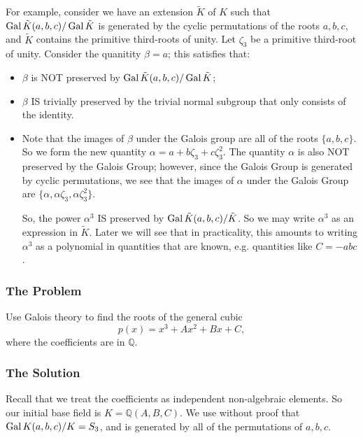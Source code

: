 \begin{itemize}
For example, consider we have an extension \(\tilde K\) of \(K\) such that 
\(\operatorname{Gal} \tilde K(a, b, c) / \operatorname{Gal} \tilde K\) is generated by the cyclic permutations of the roots
\(a, b, c\), and \(\tilde K\) contains the primitive third-roots of unity. Let \(\zeta_3\) be a
primitive third-root of unity. Consider the quanitity \(\beta = a\); this satisfies that: 
    \begin{itemize}
    \item \(\beta\) is NOT preserved by \(\operatorname{Gal} \tilde K(a, b, c) / \operatorname{Gal} \tilde K\); 
    \item \(\beta\) IS trivially preserved by the trivial normal subgroup that only consists
    of the identity.
    \item Note that the images of \(\beta\) under the Galois group are all of the roots \(\{a, b, c\}\).
    So we form the new quantity \(\alpha = a + b\zeta_3 + c\zeta_3^2\). The quantity \(\alpha\) is
    also NOT preserved by the Galois Group; however, since the Galois Group is generated by cyclic
    permutations, we see that the images of \(\alpha\) under the Galois Group are 
    \(\{\alpha, \alpha \zeta_3, \alpha \zeta_3^2\}\). 

    So, the power \(\alpha^3\) IS preserved by \(\operatorname{Gal} \tilde K(a, b, c) / \tilde K\). So we
    may write \(\alpha^3\) as an expression in \(\tilde K\). Later we will see that in practicality,
    this amounts to writing \(\alpha^3\) as a polynomial in quantities that are known, e.g. quantities
    like \(C = -abc\).
    \end{itemize} 
\end{itemize}

\subsubsection*{The Problem}

Use Galois theory to find the roots of the general cubic
\begin{equation}
p(x) = x^3 + Ax^2 + Bx + C,
\end{equation}
where the coefficients are in \(\mathbb Q\).

\subsubsection*{The Solution}

Recall that we treat the coefficients as independent non-algebraic elements. So our initial base field is
\(K = \mathbb Q(A, B, C)\). We use without proof that \(\operatorname{Gal} K(a, b, c) / K = S_3\), and is generated by
all of the permutations of \(a, b, c\).

